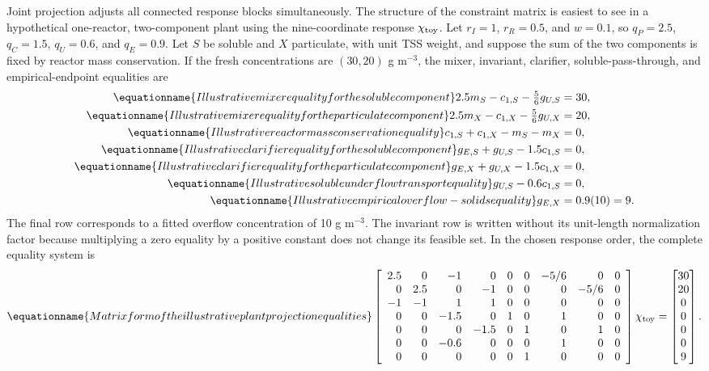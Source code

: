 Joint projection adjusts all connected response blocks simultaneously. The structure of the constraint matrix is easiest to see in a hypothetical one-reactor, two-component plant using the nine-coordinate response $\chi_{\rm toy}$. Let $r_I=1$, $r_R=0.5$, and $w=0.1$, so $q_P=2.5$, $q_C=1.5$, $q_U=0.6$, and $q_E=0.9$. Let $S$ be soluble and $X$ particulate, with unit TSS weight, and suppose the sum of the two components is fixed by reactor mass conservation. If the fresh concentrations are $(30,20)$ g m$^{-3}$, the mixer, invariant, clarifier, soluble-pass-through, and empirical-endpoint equalities are
\begin{align}
\equationname{Illustrative mixer equality for the soluble component}
2.5m_S-c_{1,S}-\tfrac56g_{U,S}&=30,\\
\equationname{Illustrative mixer equality for the particulate component}
2.5m_X-c_{1,X}-\tfrac56g_{U,X}&=20,\\
\equationname{Illustrative reactor mass conservation equality}
c_{1,S}+c_{1,X}-m_S-m_X&=0,\\
\equationname{Illustrative clarifier equality for the soluble component}
g_{E,S}+g_{U,S}-1.5c_{1,S}&=0,\\
\equationname{Illustrative clarifier equality for the particulate component}
g_{E,X}+g_{U,X}-1.5c_{1,X}&=0,\\
\equationname{Illustrative soluble underflow transport equality}
g_{U,S}-0.6c_{1,S}&=0,\\
\equationname{Illustrative empirical overflow-solids equality}
g_{E,X}&=0.9(10)=9.
\end{align}
The final row corresponds to a fitted overflow concentration of 10 g m$^{-3}$. The invariant row is written without its unit-length normalization factor because multiplying a zero equality by a positive constant does not change its feasible set. In the chosen response order, the complete equality system is
\begin{equation}
\equationname{Matrix form of the illustrative plant projection equalities}
\left[\begin{array}{rrrrrrrrr}
2.5&0&-1&0&0&0&-5/6&0&0\\
0&2.5&0&-1&0&0&0&-5/6&0\\
-1&-1&1&1&0&0&0&0&0\\
0&0&-1.5&0&1&0&1&0&0\\
0&0&0&-1.5&0&1&0&1&0\\
0&0&-0.6&0&0&0&1&0&0\\
0&0&0&0&0&1&0&0&0
\end{array}\right]\chi_{\rm toy}
=\begin{bmatrix}30\\20\\0\\0\\0\\0\\9\end{bmatrix}.
\end{equation}

